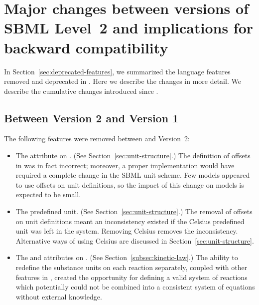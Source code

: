 
\section{Major changes between versions of SBML Level~2 and implications for backward compatibility}
\label{apdx:changes}

In Section~\ref{sec:deprecated-features}, we summarized the
language features removed and deprecated in \sbmltwothree.  Here
we describe the changes in more detail.  We describe the
cumulative changes introduced since \sbmltwoone.


\subsection{Between Version 2 and Version 1}

The following features were removed between \sbmltwoone and
Version~2:
\begin{itemize}
  
\item The  attribute on \UnitDefinition.  (See
  Section~\ref{sec:unit-structure}.)  The definition of offsets in
  \sbmltwoone was in fact incorrect; moreover, a proper
  implementation would have required a complete change in the SBML
  unit scheme.  Few models appeared to use offsets on unit
  definitions, so the impact of this change on models is expected
  to be small.
  
\item The  predefined unit.  (See
  Section~\ref{sec:unit-structure}.)  The removal of offsets on
  unit definitions meant an inconsistency existed if the Celsius
  predefined unit was left in the system.  Removing Celsius
  removes the inconsistency.  Alternative ways of using Celsius
  are discussed in Section~\ref{sec:unit-structure}.
  
\item The  and  attributes on
  \KineticLaw.  (See Section~\ref{subsec:kinetic-law}.)  The
  ability to redefine the substance units on each reaction
  separately, coupled with other features in \sbmltwoone, created
  the opportunity for defining a valid system of reactions which
  potentially could not be combined into a consistent system of
  equations without external knowledge.

\end{itemize}

